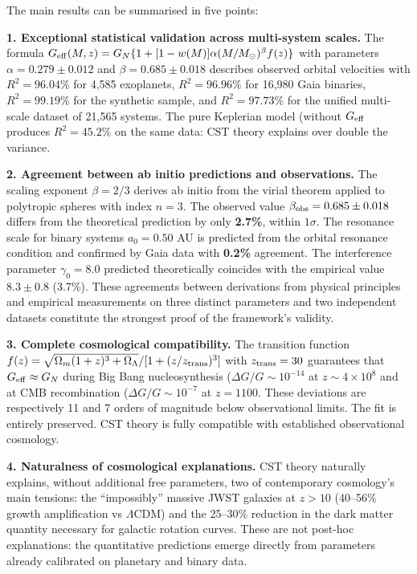 \documentclass[10pt,a4paper]{article}
\begin{document}
The main results can be summarised in five points:

\textbf{1. Exceptional statistical validation across multi-system
scales.} The formula
\(G_{\rm eff}(M,z) = G_N\{1 + [1-w(M)]\alpha(M/M_\odot)^\beta f(z)\}\)
with parameters \(\alpha = 0.279 \pm 0.012\) and
\(\beta = 0.685 \pm 0.018\) describes observed orbital velocities with
\(R^2 = 96.04\%\) for 4,585 exoplanets, \(R^2 = 96.96\%\) for 16,980
Gaia binaries, \(R^2 = 99.19\%\) for the synthetic sample, and
\(R^2 = 97.73\%\) for the unified multi-scale dataset of 21,565 systems.
The pure Keplerian model (without \(G_{\rm eff}\) produces
\(R^2 = 45.2\%\) on the same data: CST theory explains over double the
variance.

\textbf{2. Agreement between ab initio predictions and observations.}
The scaling exponent \(\beta = 2/3\) derives ab initio from the virial
theorem applied to polytropic spheres with index \(n=3\). The observed
value \(\beta_{\rm obs} = 0.685 \pm 0.018\) differs from the theoretical
prediction by only \textbf{2.7\%}, within \(1\sigma\). The resonance
scale for binary systems \(a_0 = 0.50\) AU is predicted from the orbital
resonance condition and confirmed by Gaia data with \textbf{0.2\%}
agreement. The interference parameter \(\gamma_0 = 8.0\) predicted
theoretically coincides with the empirical value \(8.3 \pm 0.8\)
(3.7\%). These agreements between derivations from physical principles
and empirical measurements on three distinct parameters and two
independent datasets constitute the strongest proof of the framework's
validity.

\textbf{3. Complete cosmological compatibility.} The transition function
\(f(z) = \sqrt{\Omega_m(1+z)^3 + \Omega_\Lambda}/[1+(z/z_{\rm trans})^3]\)
with \(z_{\rm trans} = 30\) guarantees that \(G_{\rm eff} \approx G_N\)
during Big Bang nucleosynthesis (\(\Delta G/G \sim 10^{-14}\) at
\(z \sim 4\times10^8\) and at CMB recombination
(\(\Delta G/G \sim 10^{-7}\) at \(z = 1100\). These deviations are
respectively 11 and 7 orders of magnitude below observational limits.
The \cite{PlanckCollaboration2020a} fit is entirely preserved. CST theory is fully
compatible with established observational cosmology.

\textbf{4. Naturalness of cosmological explanations.} CST theory
naturally explains, without additional free parameters, two of
contemporary cosmology's main tensions: the ``impossibly'' massive JWST
galaxies at \(z > 10\) (40--56\% growth amplification vs \(\Lambda\)CDM)
and the 25--30\% reduction in the dark matter quantity necessary for
galactic rotation curves. These are not post-hoc explanations: the
quantitative predictions emerge directly from parameters already
calibrated on planetary and binary data.
\end{document}
